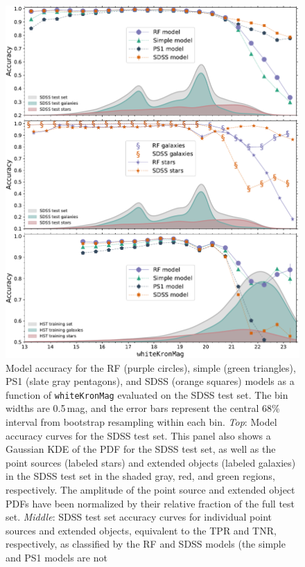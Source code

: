 \documentclass[twocolumn]{aastex62}
\begin{document}
\begin{CJK*}{UTF8}{gbsn}
\begin{figure}[htb]
 \centering
  \includegraphics[width=6.2in]{./Figures/SDSS_acc_mag.pdf}
  \caption{ Model accuracy for the RF (purple circles), simple (green
  triangles), PS1 (slate gray pentagons), and SDSS (orange squares) models
  as a function of \texttt{whiteKronMag} evaluated on the SDSS test set. The
  bin widths are 0.5\,mag, and the error bars represent the central 68\%
  interval from bootstrap resampling within each bin.
  \textit{Top}: Model accuracy curves for the SDSS test set. This panel also
  shows a Gaussian KDE of the PDF for the SDSS test set, as well as the
  point sources (labeled stars) and extended objects (labeled galaxies) in
  the SDSS test set in the shaded gray, red, and green regions,
  respectively. The amplitude of the point source and extended object PDFs
  have been normalized by their relative fraction of the full test set.
  \textit{Middle}: SDSS test set accuracy curves for individual point
  sources and extended objects, equivalent to the TPR and TNR, respectively,
  as classified by the RF and SDSS models (the simple and PS1 models are not
}
\end{figure}
\end{CJK*}
\end{document}
